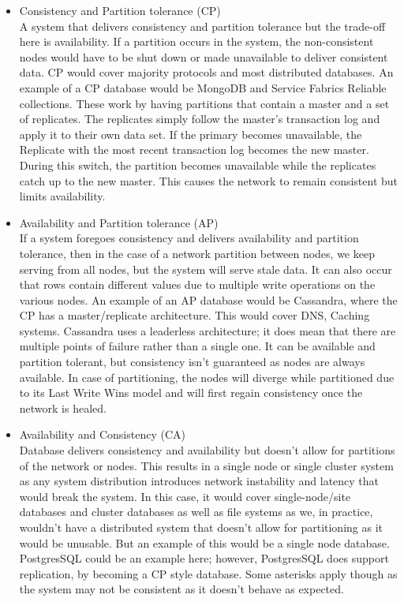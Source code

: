 \documentclass[a4paper,10pt,titlepage]{report}
\begin{document}
    \begin{itemize}
        \item Consistency and Partition tolerance (CP) \\ A system that delivers consistency and partition tolerance but the trade-off here is availability. If a partition occurs in the system, the non-consistent nodes would have to be shut down or made unavailable to deliver consistent data. CP would cover majority protocols and most distributed databases. An example of a CP database would be MongoDB and Service Fabrics Reliable collections. These work by having partitions that contain a master and a set of replicates. The replicates simply follow the master's transaction log and apply it to their own data set. If the primary becomes unavailable, the Replicate with the most recent transaction log becomes the new master. During this switch, the partition becomes unavailable while the replicates catch up to the new master. This causes the network to remain consistent but limits availability. \\

        \item Availability and Partition tolerance (AP) \\ If a system foregoes consistency and delivers availability and partition tolerance, then in the case of a network partition between nodes, we keep serving from all nodes, but the system will serve stale data. It can also occur that rows contain different values due to multiple write operations on the various nodes. An example of an AP database would be Cassandra, where the CP has a master/replicate architecture. This would cover DNS, Caching systems. Cassandra uses a leaderless architecture; it does mean that there are multiple points of failure rather than a single one. It can be available and partition tolerant, but consistency isn't guaranteed as nodes are always available. In case of partitioning, the nodes will diverge while partitioned due to its Last Write Wins model and will first regain consistency once the network is healed. \\

        \item Availability and Consistency (CA) \\ Database delivers consistency and availability but doesn't allow for partitions of the network or nodes. This results in a single node or single cluster system as any system distribution introduces network instability and latency that would break the system. In this case, it would cover single-node/site databases and cluster databases as well as file systems as we, in practice, wouldn't have a distributed system that doesn't allow for partitioning as it would be unusable. But an example of this would be a single node database. PostgresSQL could be an example here; however, PostgresSQL does support replication, by becoming a CP style database. Some asterisks apply though as the system may not be consistent\cite{aphyrpostgres} as it doesn't behave as expected. \\
    \end{itemize}
\end{document}
